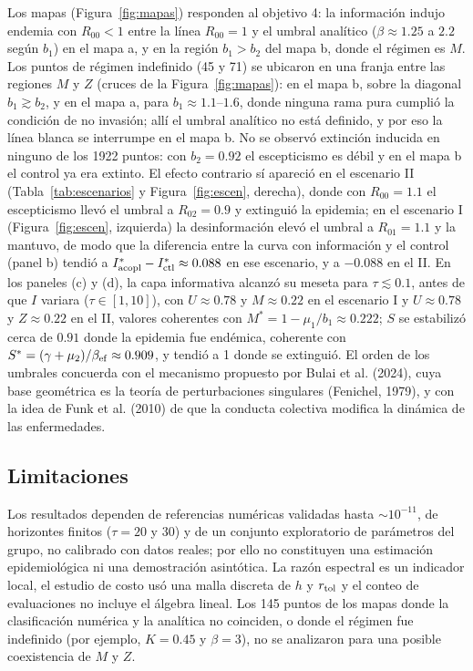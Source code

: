 Los mapas (Figura~\ref{fig:mapas}) responden al objetivo 4: la información indujo endemia con $R_{00}<1$ entre la línea $R_{00}=1$ y el umbral analítico ($\beta\approx1.25$ a $2.2$ según $b_1$) en el mapa a, y en la región $b_1>b_2$ del mapa b, donde el régimen es $M$. Los puntos de régimen indefinido (45 y 71) se ubicaron en una franja entre las regiones $M$ y $Z$ (cruces de la Figura~\ref{fig:mapas}): en el mapa b, sobre la diagonal $b_1\gtrsim b_2$, y en el mapa a, para $b_1\approx1.1$--$1.6$, donde ninguna rama pura cumplió la condición de no invasión; allí el umbral analítico no está definido, y por eso la línea blanca se interrumpe en el mapa b. No se observó extinción inducida en ninguno de los 1922 puntos: con $b_2=0.92$ el escepticismo es débil y en el mapa b el control ya era extinto. El efecto contrario sí apareció en el escenario II (Tabla~\ref{tab:escenarios} y Figura~\ref{fig:escen}, derecha), donde con $R_{00}=1.1$ el escepticismo llevó el umbral a $R_{02}=0.9$ y extinguió la epidemia; en el escenario I (Figura~\ref{fig:escen}, izquierda) la desinformación elevó el umbral a $R_{01}=1.1$ y la mantuvo, de modo que la diferencia entre la curva con información y el control (panel b) tendió a $I^*_{\rm acopl}-I^*_{\rm ctl}\approx0.088$ en ese escenario, y a $-0.088$ en el II. En los paneles (c) y (d), la capa informativa alcanzó su meseta para $\tau\lesssim0.1$, antes de que $I$ variara ($\tau\in[1,10]$), con $U\approx0.78$ y $M\approx0.22$ en el escenario I y $U\approx0.78$ y $Z\approx0.22$ en el II, valores coherentes con $M^*=1-\mu_1/b_1\approx0.222$; $S$ se estabilizó cerca de $0.91$ donde la epidemia fue endémica, coherente con $S^*=(\gamma+\mu_2)/\beta_{\rm ef}\approx0.909$, y tendió a 1 donde se extinguió. El orden de los umbrales concuerda con el mecanismo propuesto por Bulai et al. (2024), cuya base geométrica es la teoría de perturbaciones singulares (Fenichel, 1979), y con la idea de Funk et al. (2010) de que la conducta colectiva modifica la dinámica de las enfermedades.

\subsection{Limitaciones}
Los resultados dependen de referencias numéricas validadas hasta $\sim10^{-11}$, de horizontes finitos ($\tau=20$ y $30$) y de un conjunto exploratorio de parámetros del grupo, no calibrado con datos reales; por ello no constituyen una estimación epidemiológica ni una demostración asintótica. La razón espectral es un indicador local, el estudio de costo usó una malla discreta de $h$ y $r_{\rm tol}$ y el conteo de evaluaciones no incluye el álgebra lineal. Los 145 puntos de los mapas donde la clasificación numérica y la analítica no coinciden, o donde el régimen fue indefinido (por ejemplo, $K=0.45$ y $\beta=3$), no se analizaron para una posible coexistencia de $M$ y $Z$.

